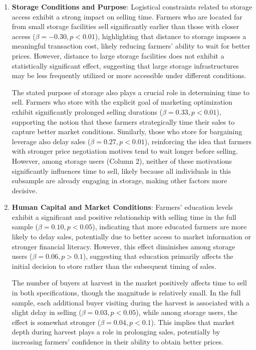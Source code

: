 \documentclass[12pt]{article}
\begin{document}
\begin{enumerate}
    \item \textbf{Storage Conditions and Purpose}: Logistical constraints related to storage access exhibit a strong impact on selling time. Farmers who are located far from small storage facilities sell significantly earlier than those with closer access (\(\beta = -0.30, p<0.01\)), highlighting that distance to storage imposes a meaningful transaction cost, likely reducing farmers' ability to wait for better prices. However, distance to large storage facilities does not exhibit a statistically significant effect, suggesting that large storage infrastructures may be less frequently utilized or more accessible under different conditions.  
    
    The stated purpose of storage also plays a crucial role in determining time to sell. Farmers who store with the explicit goal of marketing optimization exhibit significantly prolonged selling durations (\(\beta = 0.33, p<0.01\)), supporting the notion that these farmers strategically time their sales to capture better market conditions. Similarly, those who store for bargaining leverage also delay sales (\(\beta = 0.27, p<0.01\)), reinforcing the idea that farmers with stronger price negotiation motives tend to wait longer before selling. However, among storage users (Column 2), neither of these motivations significantly influences time to sell, likely because all individuals in this subsample are already engaging in storage, making other factors more decisive.

    \item \textbf{Human Capital and Market Conditions}: Farmers’ education levels exhibit a significant and positive relationship with selling time in the full sample (\(\beta = 0.10, p<0.05\)), indicating that more educated farmers are more likely to delay sales, potentially due to better access to market information or stronger financial literacy. However, this effect diminishes among storage users (\(\beta = 0.06, p>0.1\)), suggesting that education primarily affects the initial decision to store rather than the subsequent timing of sales.  
    
    The number of buyers at harvest in the market positively affects time to sell in both specifications, though the magnitude is relatively small. In the full sample, each additional buyer visiting during the harvest is associated with a slight delay in selling (\(\beta = 0.03, p<0.05\)), while among storage users, the effect is somewhat stronger (\(\beta = 0.04, p<0.1\)). This implies that market depth during harvest plays a role in prolonging sales, potentially by increasing farmers’ confidence in their ability to obtain better prices.
\end{enumerate}
\end{document}
